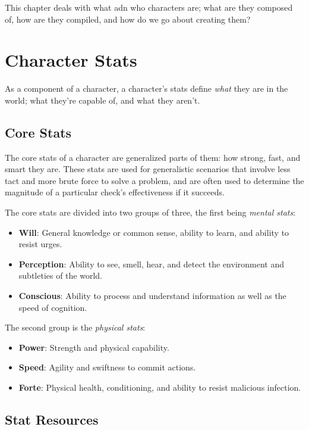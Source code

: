 \documentclass[../main.tex]{subfiles}
\begin{document}
    This chapter deals with what adn who characters are; what are they composed of, how are they compiled, and how do we go about creating them? 

    \section{Character Stats}

        As a component of a character, a character's stats define \emph{what} they are in the world; what they're capable of, and what they aren't.

    \subsection{Core Stats}

        The core stats of a character are generalized parts of them: how strong, fast, and smart they are. These stats are used for generalistic scenarios that involve less tact and more brute force to solve a problem, and are often used to determine the magnitude of a particular check's effectiveness if it succeeds.

        The core stats are divided into two groups of three, the first being \emph{mental stats}:

    \begin{itemize}
        \item \textbf{Will}: General knowledge or common sense, ability to learn, and ability to resist urges. 
        \item \textbf{Perception}: Ability to see, smell, hear, and detect the environment and subtleties of the world.
        \item \textbf{Conscious}: Ability to process and understand information as well as the speed of cognition.
    \end{itemize}

        The second group is the {\em physical stats}:

    \begin{itemize}
        \item \textbf{Power}: Strength and physical capability.
        \item \textbf{Speed}: Agility and swiftness to commit actions.
        \item \textbf{Forte}: Physical health, conditioning, and ability to resist malicious infection.
    \end{itemize}

    \subsection{Stat Resources}
\end{document}
